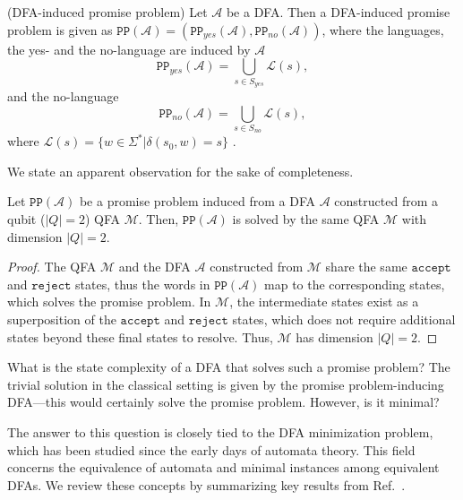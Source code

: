 \documentclass[../main.tex]{subfiles}
\begin{document}
\begin{definition}\label{def:dfainducedpp} (DFA-induced promise problem) Let $\mathcal{A}$ be a DFA. Then a DFA-induced promise problem is given as $\mathtt{PP}(\mathcal{A}) = (\mathtt{PP}_{yes}(\mathcal{A}), \mathtt{PP}_{no}(\mathcal{A}))$, where the languages, the yes- and the no-language are induced by $\mathcal{A}$
    \begin{equation}
        \mathtt{PP}_{yes}(\mathcal{A}) = \bigcup_{s \in S_{yes}} \mathcal{L}(s) ,
    \end{equation}
    and the no-language
    \begin{equation}
         \mathtt{PP}_{no}(\mathcal{A}) = \bigcup_{s \in S_{no}} \mathcal{L}(s) ,
    \end{equation}
    where $\mathcal{L}(s) = \{ w \in \Sigma^* | \delta(s_0,w) = s \}$ .
\end{definition}

We state an apparent observation for the sake of completeness.

\begin{theorem}
    Let $\mathtt{PP}(\mathcal{A})$ be a promise problem induced from a DFA $\mathcal{A}$ constructed from a qubit ($|Q| = 2$) QFA $\mathcal{M}$.  Then, $\mathtt{PP}(\mathcal{A})$ is solved by the same QFA $\mathcal{M}$ with dimension $|Q| = 2$.
\end{theorem}

\begin{proof}
     The QFA $\mathcal{M}$ and the DFA $\mathcal{A}$ constructed from $\mathcal{M}$ share the same $\mathtt{accept}$ and $\mathtt{reject}$  states, thus the words in $\mathtt{PP}(\mathcal{A})$ map to the corresponding states, which solves the promise problem. In $\mathcal{M}$, the intermediate states exist as a superposition of the $\mathtt{accept}$ and $\mathtt{reject}$  states, which does not require additional states beyond these final states to resolve. Thus, $\mathcal{M}$ has dimension $|Q| = 2$.
\end{proof}


What is the state complexity of a DFA that solves such a promise problem? The trivial solution in the classical setting is given by the promise problem-inducing \ac{DFA}—this would certainly solve the promise problem. However, is it minimal?

The answer to this question is closely tied to the DFA minimization problem, which has been studied since the early days of automata theory. This field concerns the equivalence of automata and minimal instances among equivalent \acp{DFA}. We review these concepts by summarizing key results from Ref.~\cite{hopcroft2001introduction}.
\end{document}
